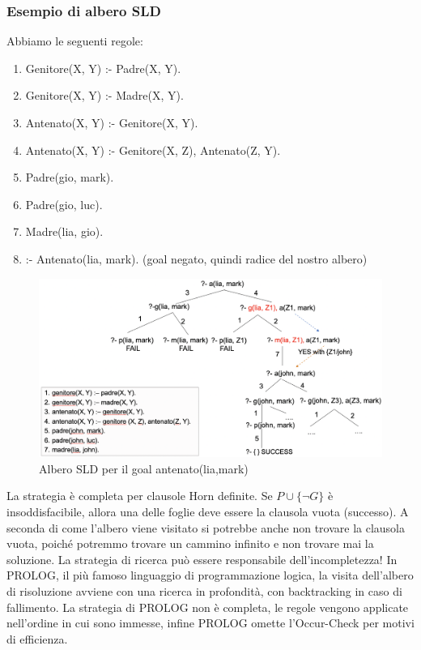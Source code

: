 \documentclass{article}
\begin{document}
\subsubsection{Esempio di albero SLD}
Abbiamo le seguenti regole:
\begin{enumerate}
    \item Genitore(X, Y) :- Padre(X, Y).
    \item Genitore(X, Y) :- Madre(X, Y).
    \item Antenato(X, Y) :- Genitore(X, Y).
    \item Antenato(X, Y) :- Genitore(X, Z), Antenato(Z, Y).
    \item Padre(gio, mark).
    \item Padre(gio, luc).
    \item Madre(lia, gio).
    \item :- Antenato(lia, mark). \quad (goal negato, quindi radice del nostro albero)
\end{enumerate}
\begin{figure}[H]
\centering
\includegraphics[scale=0.44]{Images/SLDtreeesempio.png}
\caption{Albero SLD per il goal antenato(lia,mark)}
\end{figure}
La strategia è completa per clausole Horn definite. Se $P \cup \{\neg G\}$ è insoddisfacibile, allora una delle foglie deve essere la clausola vuota (successo).\newline
A seconda di come l’albero viene visitato si potrebbe anche non trovare la clausola vuota, poiché potremmo trovare un cammino infinito e non trovare mai la soluzione. La strategia di ricerca può essere responsabile dell'incompletezza! In PROLOG, il più famoso linguaggio di programmazione logica, la visita dell'albero di risoluzione avviene con una ricerca in profondità, con backtracking in caso di fallimento. La strategia di PROLOG non è completa, le regole vengono applicate nell'ordine in cui sono immesse, infine PROLOG omette l’Occur-Check per motivi di efficienza.
\end{document}
